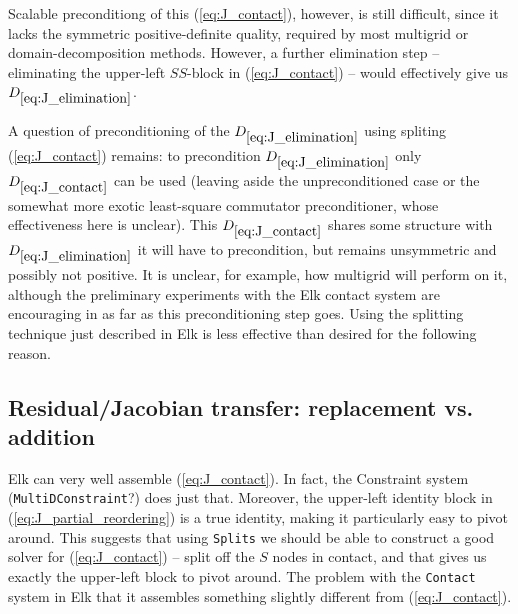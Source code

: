 \documentclass[11pt]{article}
\begin{document}
Scalable preconditiong of this (\ref{eq:J_contact}), however, is still difficult, since it lacks
the symmetric positive-definite quality, required by most multigrid or domain-decomposition methods.
However, a further elimination step -- eliminating the upper-left $SS$-block in (\ref{eq:J_contact}) --
would effectively give us $D_{\ref{eq:J_elimination}}$.

A question of preconditioning of the $D_{\ref{eq:J_elimination}}$ using spliting (\ref{eq:J_contact}) remains:
to precondition $D_{\ref{eq:J_elimination}}$ only $D_{\ref{eq:J_contact}}$ can be used (leaving aside the unpreconditioned case or
the somewhat more exotic least-square commutator preconditioner, whose effectiveness here is unclear).  This $D_{\ref{eq:J_contact}}$
shares some structure with $D_{\ref{eq:J_elimination}}$ it will have to precondition, but remains unsymmetric and possibly not positive.  It is unclear, for example, how multigrid
will perform on it, although the preliminary experiments with the Elk contact system are encouraging in as far as this preconditioning step goes.  Using the splitting technique
just described in Elk is less effective than desired for the following reason.

\subsection{Residual/Jacobian transfer: replacement vs. addition}
Elk can very well assemble (\ref{eq:J_contact}).
In fact, the Constraint system (\texttt{MultiDConstraint}?) does just that.
Moreover, the upper-left identity block in (\ref{eq:J_partial_reordering}) is a true identity,
making it particularly easy to pivot around. This suggests that using \texttt{Splits} we should be able to construct a good solver
for (\ref{eq:J_contact}) -- split off the $S$ nodes in contact, and that gives us
exactly the upper-left block to pivot around.
The problem with the \texttt{Contact} system in Elk that it assembles something slightly different from (\ref{eq:J_contact}).
\end{document}
